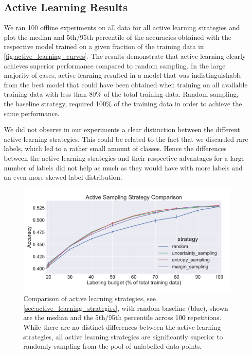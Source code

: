 \documentclass[runningheads,a4paper]{article}
\begin{document}
\subsection{Active Learning Results}
\label{sec:active_learning_results}
We ran 100 offline experiments on all data for all active learning strategies and plot the median and 5th/95th percentile of the accuracies obtained with the respective model trained on a given fraction of the training data in \autoref{fig:active_learning_curves}. The results demonstrate that active learning clearly achieves superior performance compared to random sampling. In the large majority of cases, active learning resulted in a model that was indistinguishable from the best model that could have been obtained when training on all available training data with less than 80\% of the total training data. Random sampling, the baseline strategy, required 100\% of the training data in order to achieve the same performance. 

We did not observe in our experiments a clear distinction between the different active learning strategies. This could be related to the fact that we discarded rare labels, which led to a rather small amount of classes. Hence the differences between the active learning strategies and their respective advantages for a large number of labels did not help as much as they would have with more labels and an even more skewed label distribution. 

\begin{figure}
\begin{center}
\includegraphics[width=\textwidth]{images/active_learning_manifesto.pdf} 
%
\end{center}
\caption{Comparison of active learning strategies, see \autoref{sec:active_learning_strategies}, with random baseline (blue), shown are the median and the 5th/95th percentile across 100 repetitions. While there are no distinct differences between the active learning strategies, all active learning strategies are significantly superior to randomly sampling from the pool of unlabelled data points. 
\label{fig:active_learning_curves}
}
\end{figure}
\end{document}
